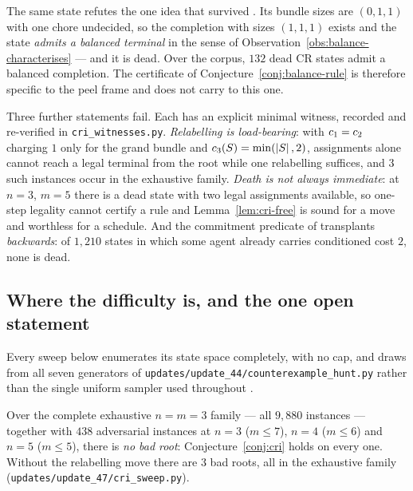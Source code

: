 \begin{remark}
\label{rem:cri-balance-fails}
The same state refutes the one idea that survived . Its
bundle sizes are $(0,1,1)$ with one chore undecided, so the completion with
sizes $(1,1,1)$ exists and the state \emph{admits a balanced terminal} in the
sense of Observation~\ref{obs:balance-characterises} --- and it is dead. Over
the corpus, $132$ dead CR states admit a balanced completion. The certificate of
Conjecture~\ref{conj:balance-rule} is therefore specific to the peel frame and
does not carry to this one.
\end{remark}

Three further statements fail. Each has an explicit minimal witness, recorded
and re-verified in \texttt{cri\_witnesses.py}.
\emph{Relabelling is load-bearing}: with
$c_1 = c_2$ charging $1$ only for the grand bundle and
$c_3(S) = \min(\left\lvert S\right\rvert,2)$, assignments alone cannot reach a legal terminal
from the root while one relabelling suffices, and $3$ such instances occur in
the exhaustive family. \emph{Death is not always immediate}: at $n = 3$,
$m = 5$ there is a dead state with two legal assignments available, so one-step
legality cannot certify a rule and Lemma~\ref{lem:cri-free} is sound for a move
and worthless for a schedule. And the commitment predicate of
 transplants \emph{backwards}: of $1{,}210$ states in
which some agent already carries conditioned cost $2$, none is dead.

\subsection{Where the difficulty is, and the one open statement}
\label{sec:cri-evidence}

Every sweep below enumerates its state space completely, with no cap, and draws
from all seven generators of \texttt{updates/update\_44/counterexample\_hunt.py} rather
than the single uniform sampler used throughout .

\begin{observation}
\label{obs:cri-sweep}
Over the complete exhaustive $n = m = 3$ family --- all $9{,}880$ instances ---
together with $438$ adversarial instances at $n = 3$ ($m \le 7$), $n = 4$
($m \le 6$) and $n = 5$ ($m \le 5$), there is \emph{no bad root}:
Conjecture~\ref{conj:cri} holds on every one. Without the relabelling move there
are $3$ bad roots, all in the exhaustive family
(\texttt{updates/update\_47/cri\_sweep.py}).
\end{observation}

